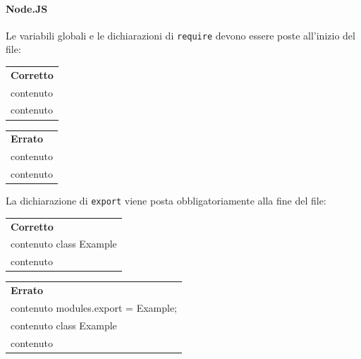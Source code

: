 \paragraph{Node.JS}
Le variabili globali e le dichiarazioni di \texttt{require} devono essere poste all'inizio del file:\\

\begin{minipage}{0.45\textwidth}
	\begin{tabular}{p{\textwidth}}	
		\textbf{Corretto}
		\begin{lstlisting}
		var axios = require("axios")
		
		class Example {
		\\contenuto
		}
		
		class SecondExample {
		\\contenuto
		}
		\end{lstlisting}
	\end{tabular}
\end{minipage}
\hfill
\begin{minipage}{0.45\textwidth}
	\begin{tabular}{|p{\textwidth}}		
		\textbf{Errato}
		\begin{lstlisting}
		class Example{
		\\contenuto
		}
		
		var axios = require("axios")
		
		class SecondExample {
		\\contenuto
		}
		\end{lstlisting}
	\end{tabular}
	
\end{minipage}
\newpage
La dichiarazione di \texttt{export} viene posta obbligatoriamente alla fine del file:\\

\begin{minipage}{0.45\textwidth}
	\begin{tabular}{p{\textwidth}}	
		\textbf{Corretto}
		\begin{lstlisting}
		\\contenuto
		class Example {
		\\contenuto
		}

		modules.export = Example;
		\end{lstlisting}
	\end{tabular}
\end{minipage}
\hfill
\begin{minipage}{0.45\textwidth}
	\begin{tabular}{|p{\textwidth}}		
		\textbf{Errato}
		\begin{lstlisting}
		\\contenuto
		modules.export = Example;
		\\contenuto
		class Example {
		\\contenuto
		}
		\end{lstlisting}
	\end{tabular}
	
\end{minipage}

